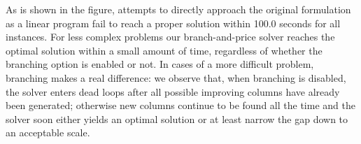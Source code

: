 \documentclass[
	11pt,
	DIV10,
	ngerman,
	a4paper,
	oneside,
	headings=normal,
	captions=tableheading,
	final,
	numbers=noenddot
]{scrartcl}
\begin{document}
As is shown in the figure, attempts to directly approach the original formulation as a linear program fail to reach a proper solution within 100.0 seconds for all instances. For less complex problems our branch-and-price solver reaches the optimal solution within a small amount of time, regardless of whether the branching option is enabled or not. In cases of a more difficult problem, branching makes a real difference: we observe that, when branching is disabled, the solver enters dead loops after all possible improving columns have already been generated; otherwise new columns continue to be found all the time and the solver soon either yields an optimal solution or at least narrow the gap down to an acceptable scale.



\end{document}
